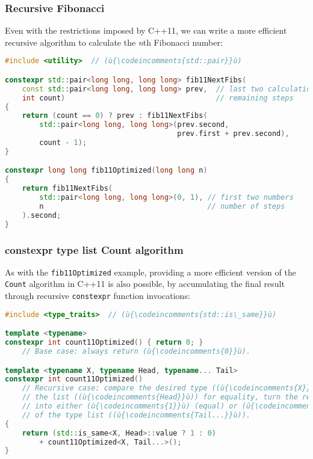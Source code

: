 \subsubsection[Recursive Fibonacci]{Recursive Fibonacci}\label{recursive-fibonacci}

Even with the restrictions imposed by C++11, we can write a
more efficient recursive algorithm to calculate the \emph{n\/}th
Fibonacci number:

\begin{lstlisting}[language=C++]
#include <utility>  // (ù{\codeincomments{std::pair}}ù)

constexpr std::pair<long long, long long> fib11NextFibs(
    const std::pair<long long, long long> prev,  // last two calculations
    int count)                                   // remaining steps
{
    return (count == 0) ? prev : fib11NextFibs(
        std::pair<long long, long long>(prev.second,
                                        prev.first + prev.second),
        count - 1);
}

constexpr long long fib11Optimized(long long n)
{
    return fib11NextFibs(
        std::pair<long long, long long>(0, 1), // first two numbers
        n                                      // number of steps
    ).second;
}
\end{lstlisting}
    

\subsubsection[{\ttfamily constexpr} type list {\ttfamily Count} algorithm]{{\SubsubsecCode constexpr} type list {\SubsubsecCode Count} algorithm}\label{constexpr-typelist-count-algorithm}

As with the \texttt{fib11Optimized} example, providing a more efficient version of the \texttt{Count} algorithm in
C++11 is also possible, by accumulating the final result through recursive
\texttt{constexpr} function invocations:

\begin{lstlisting}[language=C++]
#include <type_traits>  // (ù{\codeincomments{std::is\_same}}ù)

template <typename>
constexpr int count11Optimized() { return 0; }
    // Base case: always return (ù{\codeincomments{0}}ù).

template <typename X, typename Head, typename... Tail>
constexpr int count11Optimized()
    // Recursive case: compare the desired type ((ù{\codeincomments{X}}ù)) and the first type in
    // the list ((ù{\codeincomments{Head}}ù)) for equality, turn the result of the comparison
    // into either (ù{\codeincomments{1}}ù) (equal) or (ù{\codeincomments{0}}ù) (not equal), and recurse with the rest
    // of the type list ((ù{\codeincomments{Tail...}}ù)).
{
    return (std::is_same<X, Head>::value ? 1 : 0)
        + count11Optimized<X, Tail...>();
}
\end{lstlisting}
    
